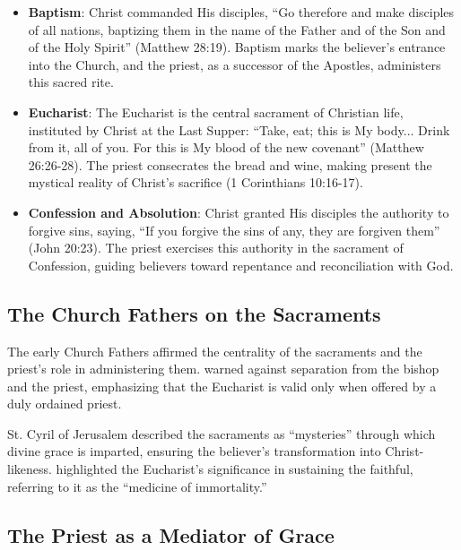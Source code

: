 \documentclass[12pt, doc]{apa7}   	%
\begin{document}
\begin{itemize}
    \item \textbf{Baptism}: Christ commanded His disciples, ``Go therefore and make disciples of all nations, baptizing them in the name of the Father and of the Son and of the Holy Spirit'' (Matthew 28:19). Baptism marks the believer’s entrance into the Church, and the priest, as a successor of the Apostles, administers this sacred rite.
    
    \item \textbf{Eucharist}: The Eucharist is the central sacrament of Christian life, instituted by Christ at the Last Supper: ``Take, eat; this is My body... Drink from it, all of you. For this is My blood of the new covenant'' (Matthew 26:26-28). The priest consecrates the bread and wine, making present the mystical reality of Christ’s sacrifice (1 Corinthians 10:16-17).

    \item \textbf{Confession and Absolution}: Christ granted His disciples the authority to forgive sins, saying, ``If you forgive the sins of any, they are forgiven them'' (John 20:23). The priest exercises this authority in the sacrament of Confession, guiding believers toward repentance and reconciliation with God.
\end{itemize}

\subsection{The Church Fathers on the Sacraments}

The early Church Fathers affirmed the centrality of the sacraments and the priest’s role in administering them. \cite{epistles_ignatius} warned against separation from the bishop and the priest, emphasizing that the Eucharist is valid only when offered by a duly ordained priest. 

St. Cyril of Jerusalem \citep{early_church_akin} described the sacraments as ``mysteries'' through which divine grace is imparted, ensuring the believer’s transformation into Christ-likeness. \citet{priesthood_chrysostom,complete_work_chrysostom} highlighted the Eucharist’s significance in sustaining the faithful, referring to it as the ``medicine of immortality.''

\subsection{The Priest as a Mediator of Grace}
\end{document}
